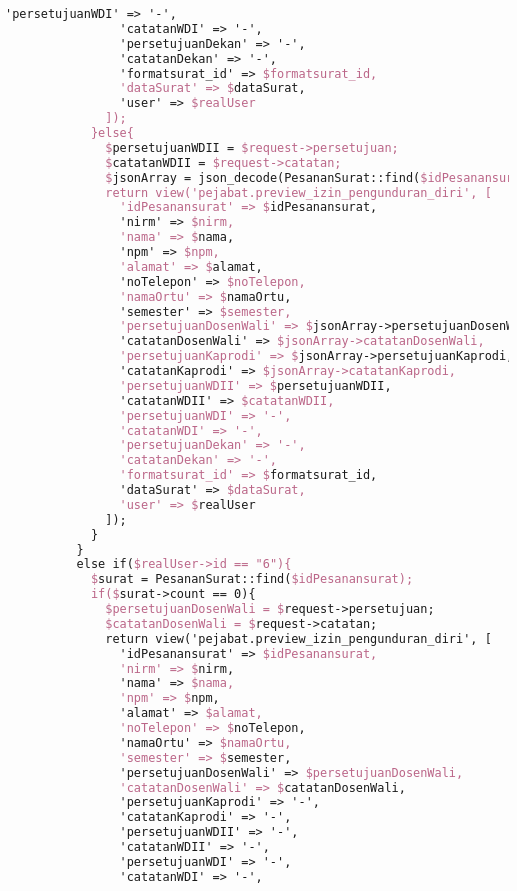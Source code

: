 \begin{lstlisting}[language=tex,basicstyle=\tiny,caption=PesanansuratController.php]
                'persetujuanWDI' => '-',
                'catatanWDI' => '-',
                'persetujuanDekan' => '-',
                'catatanDekan' => '-',
                'formatsurat_id' => $formatsurat_id,
                'dataSurat' => $dataSurat,
                'user' => $realUser
              ]);
            }else{
              $persetujuanWDII = $request->persetujuan;
              $catatanWDII = $request->catatan;
              $jsonArray = json_decode(PesananSurat::find($idPesanansurat)->dataSurat);
              return view('pejabat.preview_izin_pengunduran_diri', [
                'idPesanansurat' => $idPesanansurat,
                'nirm' => $nirm,
                'nama' => $nama,
                'npm' => $npm,
                'alamat' => $alamat,
                'noTelepon' => $noTelepon,
                'namaOrtu' => $namaOrtu,
                'semester' => $semester,
                'persetujuanDosenWali' => $jsonArray->persetujuanDosenWali,
                'catatanDosenWali' => $jsonArray->catatanDosenWali,
                'persetujuanKaprodi' => $jsonArray->persetujuanKaprodi,
                'catatanKaprodi' => $jsonArray->catatanKaprodi,
                'persetujuanWDII' => $persetujuanWDII,
                'catatanWDII' => $catatanWDII,
                'persetujuanWDI' => '-',
                'catatanWDI' => '-',
                'persetujuanDekan' => '-',
                'catatanDekan' => '-',
                'formatsurat_id' => $formatsurat_id,
                'dataSurat' => $dataSurat,
                'user' => $realUser
              ]);
            }
          }
          else if($realUser->id == "6"){
            $surat = PesananSurat::find($idPesanansurat);
            if($surat->count == 0){
              $persetujuanDosenWali = $request->persetujuan;
              $catatanDosenWali = $request->catatan;
              return view('pejabat.preview_izin_pengunduran_diri', [
                'idPesanansurat' => $idPesanansurat,
                'nirm' => $nirm,
                'nama' => $nama,
                'npm' => $npm,
                'alamat' => $alamat,
                'noTelepon' => $noTelepon,
                'namaOrtu' => $namaOrtu,
                'semester' => $semester,
                'persetujuanDosenWali' => $persetujuanDosenWali,
                'catatanDosenWali' => $catatanDosenWali,
                'persetujuanKaprodi' => '-',
                'catatanKaprodi' => '-',
                'persetujuanWDII' => '-',
                'catatanWDII' => '-',
                'persetujuanWDI' => '-',
                'catatanWDI' => '-',

\end{lstlisting}
